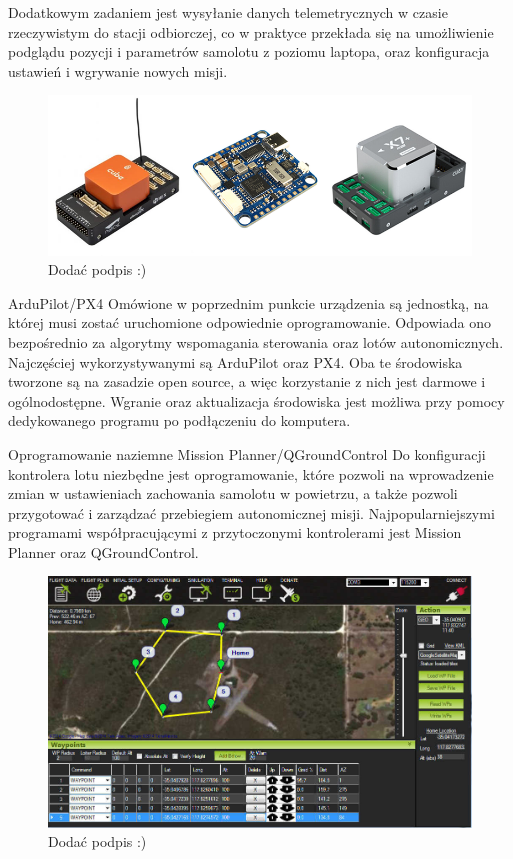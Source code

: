 \documentclass[12pt, a4paper]{article}
\begin{document}
Dodatkowym zadaniem jest wysyłanie danych telemetrycznych w czasie rzeczywistym do stacji odbiorczej, co w praktyce przekłada się na umożliwienie podglądu pozycji i parametrów samolotu z poziomu laptopa, oraz konfiguracja ustawień i wgrywanie nowych misji.

 \begin{figure}[ht]
    \centering
    \includegraphics[width=1\textwidth]{kontrolery}
    \caption{Dodać podpis :)}
\end{figure}


ArduPilot/PX4
Omówione w poprzednim punkcie urządzenia są jednostką, na której musi zostać uruchomione odpowiednie oprogramowanie. Odpowiada ono bezpośrednio za algorytmy wspomagania sterowania oraz lotów autonomicznych. Najczęściej wykorzystywanymi są ArduPilot oraz PX4. Oba te środowiska tworzone są na zasadzie open source, a więc korzystanie z nich jest darmowe i ogólnodostępne. Wgranie oraz aktualizacja środowiska jest możliwa przy pomocy dedykowanego programu po podłączeniu do komputera.

Oprogramowanie naziemne
Mission Planner/QGroundControl
Do konfiguracji kontrolera lotu niezbędne jest oprogramowanie, które pozwoli na wprowadzenie zmian w ustawieniach zachowania samolotu w powietrzu, a także pozwoli przygotować i zarządzać przebiegiem autonomicznej misji. Najpopularniejszymi programami współpracującymi z przytoczonymi kontrolerami jest Mission Planner oraz QGroundControl.

\begin{figure}[ht]
    \centering
    \includegraphics[width=1\textwidth]{missionplanner}
    \caption{Dodać podpis :)}
\end{figure}
\end{document}
